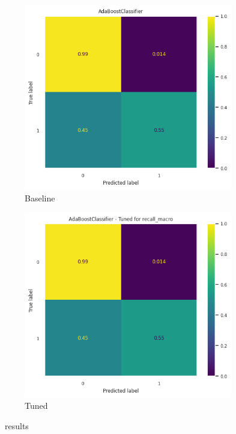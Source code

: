 \begin{frame}{\subsecname}
\begin{figure}
    \centering
    \begin{subfigure}[c]{0.4\textwidth}
        \includegraphics[width=\textwidth]{images/models/Ada_base.png}
        \caption{Baseline}
    \end{subfigure}
    \begin{subfigure}[c]{0.4\textwidth}
        \includegraphics[width=\textwidth]{images/models/Ada_tuned.png}
        \caption{Tuned}
    \end{subfigure}
    \caption{\subsecname\ results}
\end{figure}
\end{frame}

